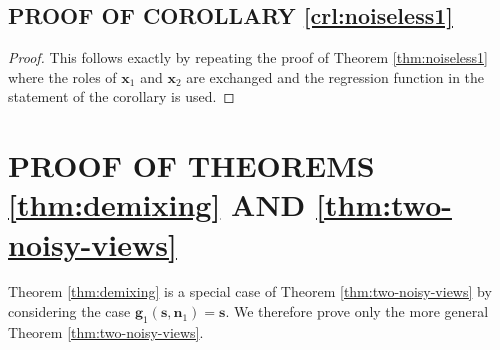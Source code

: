 \documentclass[letterpaper]{article}
\theoremstyle{definition}
\begin{document}
\subsection{PROOF OF COROLLARY \ref{crl:noiseless1}}\label{appendix:proof-cor2}
\begin{proof}
This follows exactly by repeating the proof of Theorem \ref{thm:noiseless1} where the roles of $\bm{x}_1$ and $\bm{x}_2$ are exchanged and the regression function in the statement of the corollary is used.
\end{proof}

\section{PROOF OF THEOREMS \ref{thm:demixing} AND \ref{thm:two-noisy-views}}
\label{appendix:thm1}

Theorem \ref{thm:demixing} is a special case of Theorem \ref{thm:two-noisy-views} by considering the case $\bm{g}_1(\bm{s}, \bm{n}_1) = \bm{s}$.
We therefore prove only the more general Theorem \ref{thm:two-noisy-views}.
\end{document}
